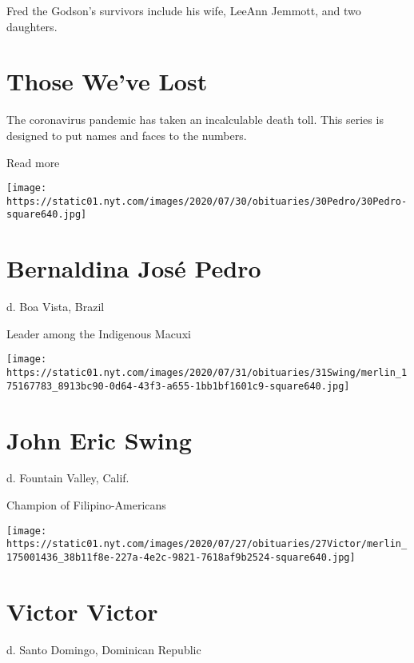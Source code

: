 Fred the Godson's survivors include his wife, LeeAnn Jemmott, and two
daughters.

\href{https://www.nytimes.com/interactive/2020/obituaries/people-died-coronavirus-obituaries.html?action=click\&pgtype=Article\&state=default\&region=BELOW_MAIN_CONTENT\&context=covid_obits_promo}{}

\hypertarget{those-weve-lost}{%
\section{Those We've Lost}\label{those-weve-lost}}

The coronavirus pandemic has taken an incalculable death toll. This
series is designed to put names and faces to the numbers.

Read more

\texttt{[image: https://static01.nyt.com/images/2020/07/30/obituaries/30Pedro/30Pedro-square640.jpg]}

\hypertarget{bernaldina-josuxe9-pedro}{%
\section{Bernaldina José Pedro}\label{bernaldina-josuxe9-pedro}}

d. Boa Vista, Brazil

Leader among the Indigenous Macuxi

\texttt{[image: https://static01.nyt.com/images/2020/07/31/obituaries/31Swing/merlin\_175167783\_8913bc90-0d64-43f3-a655-1bb1bf1601c9-square640.jpg]}

\hypertarget{john-eric-swing}{%
\section{John Eric Swing}\label{john-eric-swing}}

d. Fountain Valley, Calif.

Champion of Filipino-Americans

\texttt{[image: https://static01.nyt.com/images/2020/07/27/obituaries/27Victor/merlin\_175001436\_38b11f8e-227a-4e2c-9821-7618af9b2524-square640.jpg]}

\hypertarget{victor-victor}{%
\section{Victor Victor}\label{victor-victor}}

d. Santo Domingo, Dominican Republic


